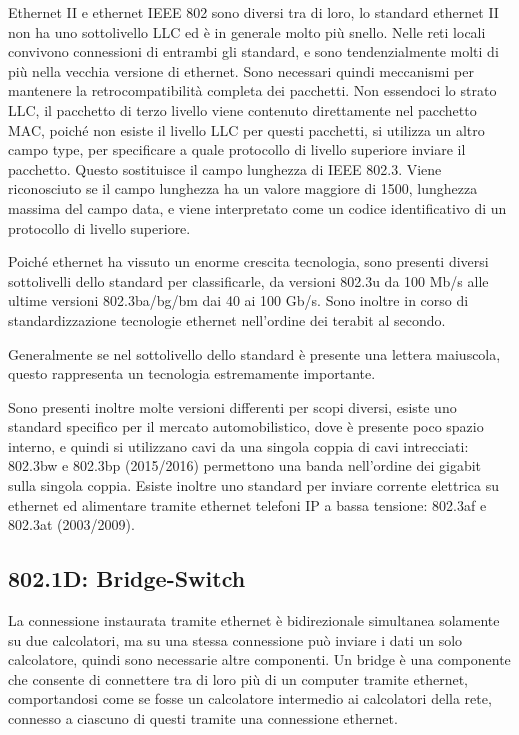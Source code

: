 \documentclass{article}
\numberwithin{equation}{subsection}
\begin{document}
Ethernet II e ethernet IEEE 802 sono diversi tra di loro, lo standard ethernet II non ha uno sottolivello LLC ed è in generale molto più snello. Nelle reti locali convivono connessioni di entrambi gli standard, e 
sono tendenzialmente molti di più nella vecchia versione di ethernet. Sono necessari quindi meccanismi per mantenere la retrocompatibilità completa dei pacchetti. 
Non essendoci lo strato LLC, il pacchetto di terzo livello viene contenuto direttamente nel pacchetto MAC, poiché non esiste il livello LLC per questi pacchetti, si utilizza un altro campo type, per specificare a 
quale protocollo di livello superiore inviare il pacchetto. Questo sostituisce il campo lunghezza di IEEE 802.3. Viene riconosciuto se il campo lunghezza ha un valore maggiore di 1500, lunghezza massima del campo 
data, e viene interpretato come un codice identificativo di un protocollo di livello superiore. 


Poiché ethernet ha vissuto un enorme crescita tecnologia, sono presenti diversi sottolivelli dello standard per classificarle, da versioni 802.3u da 100 Mb/s alle ultime versioni 802.3ba/bg/bm dai 40 ai 100 
Gb/s. Sono inoltre in corso di standardizzazione tecnologie ethernet nell'ordine dei terabit al secondo.  

Generalmente se nel sottolivello dello standard è presente una lettera maiuscola, questo rappresenta un tecnologia estremamente importante. 


Sono presenti inoltre molte versioni differenti per scopi diversi, esiste uno standard specifico per il mercato automobilistico, dove è presente poco spazio interno, e quindi si utilizzano cavi da una singola coppia 
di cavi intrecciati: 802.3bw e 802.3bp (2015/2016) permettono una banda nell'ordine dei gigabit sulla singola coppia. Esiste inoltre uno standard per inviare corrente elettrica su ethernet ed alimentare tramite 
ethernet telefoni IP a bassa tensione: 802.3af e 802.3at (2003/2009). 

\subsection{802.1D: Bridge-Switch}

La connessione instaurata tramite ethernet è bidirezionale simultanea solamente su due calcolatori, ma su una stessa connessione può inviare i dati un solo 
calcolatore, quindi sono necessarie altre componenti. Un bridge è una componente che consente di connettere tra di loro più di un computer 
tramite ethernet, comportandosi come se fosse un calcolatore intermedio ai calcolatori della rete, connesso a ciascuno di questi tramite una connessione 
ethernet. 
\end{document}
